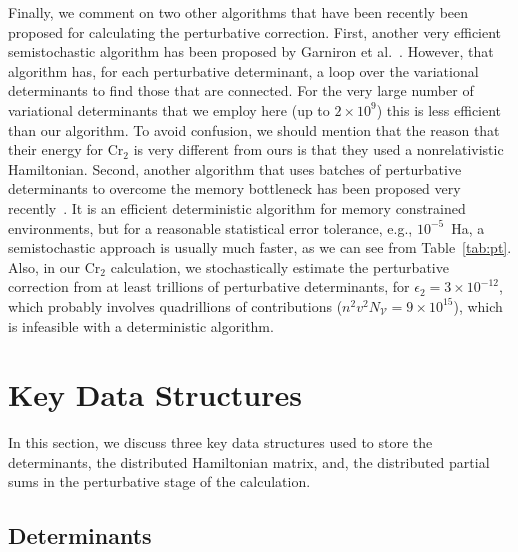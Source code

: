\documentclass[%
preprint,
 superscriptaddress,
 amsmath,amssymb,
 aps,
]{revtex4-1}
\def\V{\mathcal{V}}
\begin{document}
Finally, we comment on two other algorithms that have been recently been proposed for calculating the perturbative correction.
First, another very efficient semistochastic algorithm has been proposed
by Garniron et al.~\cite{GarSceLooCaf-JCP-17}.  However, that algorithm has, for each perturbative determinant, a loop over the variational determinants to find those that are connected.  For the very large number of variational determinants that we employ
here (up to $2 \times 10^9$) this is less efficient than our algorithm.
To avoid confusion, we should mention that the reason that their energy for Cr$_2$ is very different from ours is
that they used a nonrelativistic Hamiltonian.
Second, another algorithm that uses batches of perturbative determinants to overcome the memory bottleneck has been proposed
very recently~\cite{TubLevHaiHeaWha-ARX-18}.
It is an efficient deterministic algorithm for memory constrained environments,
but for a reasonable statistical error tolerance, e.g., $10^{-5}$~Ha,
a semistochastic approach is usually much faster, as we can see from Table~\ref{tab:pt}.
Also, in our Cr$_2$ calculation, we stochastically estimate the perturbative correction from at least trillions of perturbative determinants,
for $\epsilon_2=3\times10^{-12}$, which probably involves quadrillions of contributions
($n^2v^2N_\V = 9 \times 10^{15}$), which is infeasible with a deterministic algorithm.


\section{Key Data Structures}
\label{key}
In this section, we discuss three key data structures used to store the determinants, the distributed Hamiltonian matrix, and,
the distributed partial sums in the perturbative stage of the calculation.

\subsection{Determinants}
\label{{sec:det}}
%
%
\end{document}
